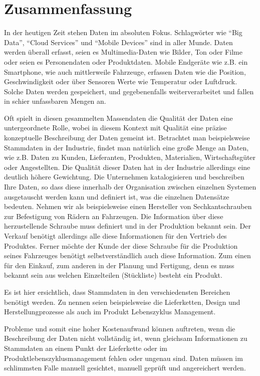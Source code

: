 \chapter*{Zusammenfassung}


In der heutigen Zeit stehen Daten im absoluten Fokus. Schlagwörter wie \enquote{Big Data}, \enquote{Cloud Services} und \enquote{Mobile Devices} sind in aller Munde. Daten werden überall erfasst, seien es Multimedia-Daten wie Bilder, Ton oder Filme oder seien es Personendaten oder Produktdaten. Mobile Endgeräte wie z.B. ein Smartphone, wie auch mittlerweile Fahrzeuge, erfassen Daten wie die Position, Geschwindigkeit oder über Sensoren Werte wie Temperatur oder Luftdruck. Solche Daten werden gespeichert, und gegebenenfalls weiterverarbeitet und fallen in schier unfassbaren Mengen an. 

Oft spielt in diesen gesammelten Massendaten die Qualität der Daten eine untergeordnete Rolle, wobei in diesem Kontext mit Qualität eine präzise konzeptuelle Beschreibung der Daten gemeint ist.  
Betrachtet man beispielsweise Stammdaten in der Industrie, findet man natürlich eine große Menge an Daten, wie z.B. Daten zu Kunden, Lieferanten, Produkten, Materialien, Wirtschaftsgüter oder Angestellten. Die Qualität dieser Daten hat in der Industrie allerdings eine deutlich höhere Gewichtung. Die Unternehmen katalogisieren und beschreiben Ihre Daten, so dass diese innerhalb der Organisation zwischen einzelnen Systemen ausgetauscht werden kann und definiert ist, was die einzelnen Datensätze bedeuten. Nehmen wir als beispielsweise einen Hersteller von Sechkantschrauben zur Befestigung von Rädern an Fahrzeugen. Die Information über diese herzustellende Schraube muss definiert und in der Produktion bekannt sein. Der Verkauf benötigt allerdings alle diese Informationen für den Vertrieb des Produktes. Ferner möchte der Kunde der diese Schraube für die Produktion seines Fahrzeuges benötigt selbstverständlich auch diese Information. Zum einen für den Einkauf, zum anderen in der Planung und Fertigung, denn es muss bekannt sein aus welchen Einzelteilen (Stückliste) besteht ein Produkt. 

Es ist hier ersichtlich, dass Stammdaten in den verschiedensten Bereichen benötigt werden. Zu nennen seien beispielsweise die Lieferketten, Design und Herstellungprozesse als auch im Produkt Lebenszyklus Management.     

Probleme und somit eine hoher Kostenaufwand können auftreten, wenn die Beschreibung der Daten nicht vollständig ist, wenn gleichsam Informationen zu Stammdaten an einem Punkt der Lieferkette oder im Produktlebenszyklusmanagement fehlen oder ungenau sind. Daten müssen im schlimmsten Falle manuell gesichtet, manuell geprüft und angereichert werden.  

